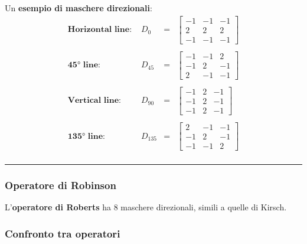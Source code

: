 \documentclass[a4paper]{article}
\newcommand{\longline}{\noindent\rule{\textwidth}{0.4pt}}
\begin{document}
	\noindent
	Un \textbf{esempio di maschere direzionali}:
	\begin{equation*}
		\begin{array}{lllc}
			\textbf{Horizontal line: } & D_{0} & = & \begin{bmatrix}
				-1 & -1  & -1 \\
				2 & 2 & 2 \\
				-1 & -1 & -1
			\end{bmatrix} \\
			&&& \\
			\boldsymbol{45°}\textbf{ line: } & D_{45} & = & \begin{bmatrix}
				-1 & -1  & 2 \\
				-1 & 2 & -1 \\
				2 & -1 & -1
			\end{bmatrix} \\
			&&& \\
			\textbf{Vertical line: } & D_{90} & = & \begin{bmatrix}
				-1 & 2  & -1 \\
				-1 & 2 & -1 \\
				-1 & 2 & -1
			\end{bmatrix} \\
			&&& \\
			\boldsymbol{135°}\textbf{ line: } & D_{135} & = & \begin{bmatrix}
				2 & -1  & -1 \\
				-1 & 2 & -1 \\
				-1 & -1 & 2
			\end{bmatrix} \\
		\end{array}
	\end{equation*}
	
	\longline
	
	\subsubsection{Operatore di Robinson}
	
	L'\textcolor{Red3}{\textbf{operatore di Roberts}} ha $8$ maschere direzionali, simili a quelle di Kirsch.\newpage
	
	\subsubsection{Confronto tra operatori}
	
\end{document}
